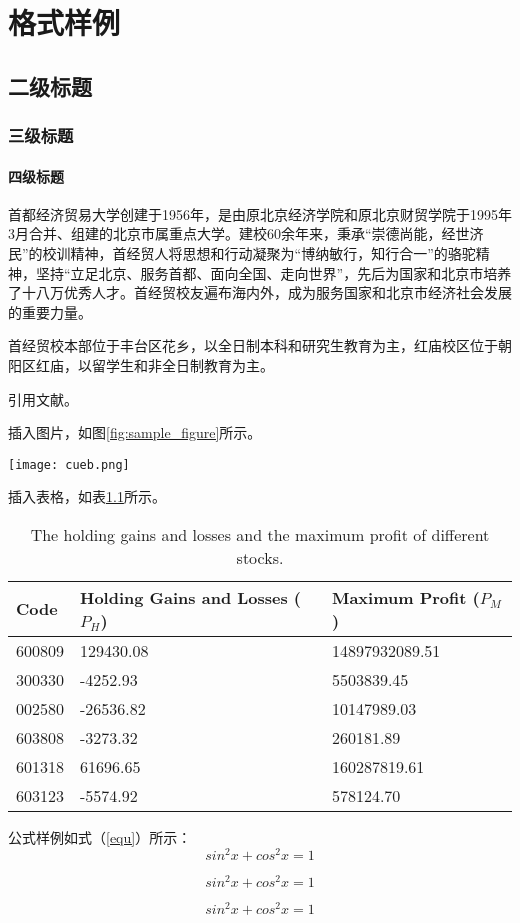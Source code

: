 \chapter{格式样例}
\section{二级标题}
\subsection{三级标题}
\subsubsection{四级标题}
首都经济贸易大学创建于1956年，是由原北京经济学院和原北京财贸学院于1995年3月合并、组建的北京市属重点大学。建校60余年来，秉承“崇德尚能，经世济民”的校训精神，首经贸人将思想和行动凝聚为“博纳敏行，知行合一”的骆驼精神，坚持“立足北京、服务首都、面向全国、走向世界”，先后为国家和北京市培养了十八万优秀人才。首经贸校友遍布海内外，成为服务国家和北京市经济社会发展的重要力量。

首经贸校本部位于丰台区花乡，以全日制本科和研究生教育为主，红庙校区位于朝阳区红庙，以留学生和非全日制教育为主。

引用文献\cite{lamport1994latex}。

插入图片，如图\ref{fig:sample_figure}所示。
\begin{figure*}[htb]
\centering
\texttt{[image: cueb.png]}
\caption{插图样例}
\label{fig:sample_figure}
\end{figure*}

插入表格，如表\ref{tab:sample_table}所示。
\begin{table}[htp]
\small
\centering
\setlength{\abovecaptionskip}{12pt}
\setlength{\belowcaptionskip}{6pt}
\caption{The holding gains and losses and the maximum profit of different stocks.}
\begin{tabular}{p{3cm}p{5cm}p{5cm}}\toprule[1.5pt]
Code& Holding Gains and Losses ($P_{H}$)& Maximum Profit ($P_{M}$)\\\midrule[1pt]
600809& 129430.08 & 14897932089.51 \\
300330& -4252.93 & 5503839.45 \\
002580& -26536.82 & 10147989.03 \\
603808& -3273.32 & 260181.89 \\
601318& 61696.65 & 160287819.61 \\
603123& -5574.92 & 578124.70\\
\bottomrule[1.5pt]
\end{tabular}
\label{tab:sample_table}
\end{table}

公式样例如式（\ref{equ}）所示：
\begin{equation}
sin^2x+cos^2x=1
\label{equ}
\end{equation} 

\begin{equation}
sin^2x+cos^2x=1
\label{equ}
\end{equation} 

\begin{equation}
sin^2x+cos^2x=1
\label{equ}
\end{equation} 